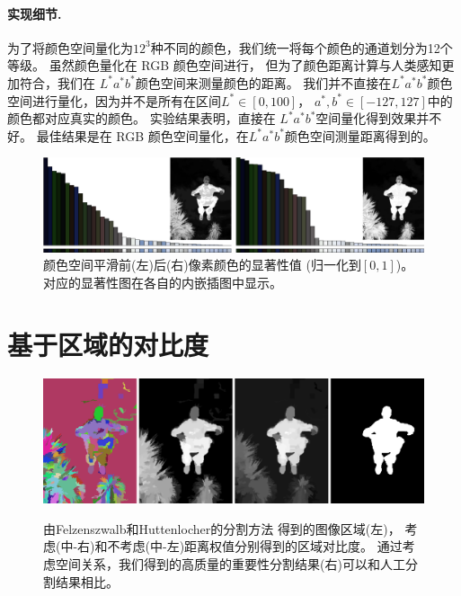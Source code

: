 \documentclass[final]{cvpr}
\newcommand{\Lab}{$L^*a^*b^*$}
\newcommand{\mypara}[1]{\paragraph{#1.}}
\begin{document}
\mypara{实现细节}
为了将颜色空间量化为$12^3$种不同的颜色，我们统一将每个颜色的通道划分为12个等级。
虽然颜色量化在 RGB 颜色空间进行，
但为了颜色距离计算与人类感知更加符合，我们在 \Lab 颜色空间来测量颜色的距离。
我们并不直接在\Lab 颜色空间进行量化，因为并不是所有在区间$L^*\in[0, 100]$，
$a^*, b^*\in[-127,127]$中的颜色都对应真实的颜色。
实验结果表明，直接在 \Lab 空间量化得到效果并不好。
最佳结果是在 RGB 颜色空间量化，在\Lab 颜色空间测量距离得到的。


\begin{figure}[t]
    \centering
    \includegraphics[width=\columnwidth]{histogram_saliency.pdf}
    \caption{颜色空间平滑前(左)后(右)像素颜色的显著性值
        (归一化到$[0, 1]$)。
        对应的显著性图在各自的内嵌插图中显示。
    }\label{fig:HCSmoothing}
\end{figure}

\section{基于区域的对比度}

\begin{figure}[b]
    \centering
    \includegraphics[width=\columnwidth]{region_contrast.pdf}\\
    \caption{由Felzenszwalb和Huttenlocher的分割方法
        \cite{04ijcv/felzenszwalb_efficient}得到的图像区域(左)，
        考虑(中-右)和不考虑(中-左)距离权值分别得到的区域对比度。
        通过考虑空间关系，我们得到的高质量的重要性分割结果(右)可以和人工分割结果相比。
    }\label{fig:regContrast}
\end{figure}
\end{document}

